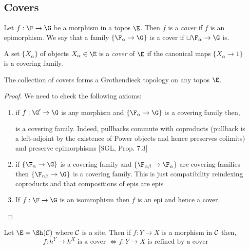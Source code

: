 \documentclass[12pt]{article}
\begin{document}
\subsection{Covers}

\begin{defn}
Let $f : \F \to \G$ be a morphism in a topos $\E$. Then $f$ is a \textit{cover} if $f$ is an epimorphism. We say that a family $\{ \F_\alpha \to \G \}$ is a cover if $\sqcup \F_\alpha \to \G$ is.
\end{defn}

\begin{defn}
A set $\{ X_\alpha \}$ of objects $X_\alpha \in \E$ is a \textit{cover} of $\E$ if the canonical maps $\{ X_\alpha \to 1 \}$ is a covering family.  
\end{defn}

\begin{prop}
The collection of covers forms a Grothendieck topology on any topos $\E$.
\end{prop}

\begin{proof}
We need to check the following axioms:
\begin{enumerate}
\item if $f : \G' \to \G$ is any morphism and $\{ \F_\alpha \to \G \}$ is a covering family then,
\begin{center}
\end{center}
is a covering family. Indeed, pullbacks commute with coproducts (pullback is a left-adjoint by the existence of Power objects and hence preserves colimits) and preserve epimorphisms [SGL, Prop. 7.3]

\item if $\{ \F_\alpha \to \G \}$ is a covering family and $\{ \F_{\alpha \beta} \to \F_\alpha \}$ are covering families then $\{ \F_{\alpha \beta} \to \G \}$ is a covering family. This is just compatibility reindexing coproducts and that compositions of epis are epis

\item If $f : \F \to \G$ is an isomrophism then $f$ is an epi and hence a cover.
\end{enumerate}
\end{proof}

\begin{prop}
Let $\E = \Sh(\C)$ where $\mathcal{C}$ is a site. Then if $f : Y \to X$ is a morphism in $\mathcal{C}$ then,
\[ f : h^Y \to h^X \text{ is a cover } \iff f : Y \to X \text{ is refined by a cover } \]
\end{prop}
\end{document}
